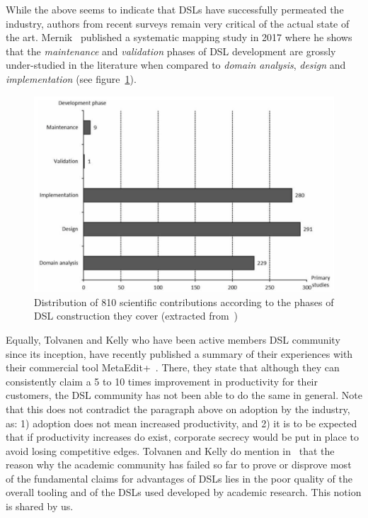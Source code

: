 \documentclass{scrartcl}
\begin{document}
While the above seems to indicate that DSLs have successfully permeated the
industry, authors from recent surveys remain very critical of the actual state
of the art. Mernik~\cite{Mernik17} published a systematic mapping study in
2017 where he shows that the \emph{maintenance} and \emph{validation} phases of
DSL development are grossly under-studied in the literature when compared to
\emph{domain analysis}, \emph{design} and \emph{implementation} (see
figure~\ref{fig:DSL_design_phases}).

\begin{figure}[!h]
\centering 
\includegraphics[width=1\textwidth]{./figures/DSL_design_phases}
\caption{Distribution of 810 scientific contributions according to the phases
of DSL construction they cover (extracted from~\cite{Mernik17})}
\label{fig:DSL_design_phases}
\end{figure}

Equally, Tolvanen and Kelly who have been active members DSL community since its
inception, have recently published a summary of their experiences with their
commercial tool MetaEdit+~\cite{TolvanenKelly2016}. There, they state that
although they can consistently claim a 5 to 10 times improvement in productivity for their customers, the DSL community has not been able to do the same in
general. Note that this does not contradict the paragraph above on adoption by
the industry, as: 1) adoption does not mean increased productivity, and 2) it is
to be expected that if productivity increases do exist, corporate secrecy would
be put in place to avoid losing competitive edges. Tolvanen and Kelly do
mention in~\cite{TolvanenKelly2016} that the reason why the academic community has
failed so far to prove or disprove most of the fundamental claims for advantages
of DSLs lies in the poor quality of the overall tooling and of the DSLs used
developed by academic research. This notion is shared by us.
\end{document}
